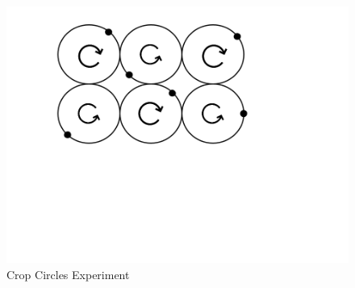 \begin{figure}
\vspace{-.2cm}
\begin{center}
\includegraphics[width=\columnwidth+.5]{figures/cropcircle1.png}
\end{center}
\vspace{-.5cm}
\caption{Crop Circles Experiment}\label{fig:cropcircle1.png}
\vspace{-.2cm}
\end{figure}


